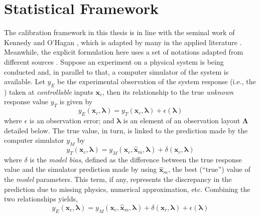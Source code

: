 \section{Statistical Framework}\label{sec:bc_statistical_framework}

The calibration framework in this thesis is in line with the seminal work of Kennedy and O'Hagan \cite{Kennedy2001},
which is adapted by many in the applied literature \cite{Bayarri2007,Higdon2008,Arendt2012,Reichert2012,Higdon2013}.
Meanwhile, the explicit formulation here uses a set of notations adapted from different sources \cite{Kennedy2001,Santner2003,Huard2006,Reichert2012,Wicaksono2016}.
Suppose an experiment on a physical system is being conducted and, in parallel to that, a computer simulator of the system is available.
Let $y_E$ be the experimental observation of the system response (i.e., the ) taken at \emph{controllable} inputs $\bm{x}_c$,
then its relationship to the true \emph{unknown} response value $y_T$ is given by
\begin{equation}
    y_E(\bm{x}_c, \bm{\lambda}) = y_T (\bm{x}_c, \bm{\lambda}) + \epsilon(\bm{\lambda})
\label{eq:bc_observation_true}
\end{equation}
where $\epsilon$ is an observation error;
and $\boldsymbol{\lambda}$ is an element of an observation layout $\boldsymbol{\Lambda}$ detailed below.
The true value, in turn, is linked to the prediction made by the computer simulator $y_M$ by
\begin{equation}
    y_T(\bm{x}_c, \boldsymbol{\lambda}) = y_M (\bm{x}_c, \hat{\bm{x}}_m, \boldsymbol{\lambda}) + \delta (\bm{x}_c, \boldsymbol{\lambda})
\label{eq:bc_true_simulation}
\end{equation}
where $\delta$ is the \emph{model bias}, defined as the difference between the true response value and the simulator prediction made by using $\hat{\bm{x}}_m$, the best (``true'') value of the \emph{model} parameters.
This term, if any, represents the discrepancy in the prediction due to missing physics, numerical approximation, etc. 
Combining the two relationships yields,
\begin{equation}
    y_E(\bm{x}_c, \boldsymbol{\lambda}) = y_M (\bm{x}_c, \hat{\bm{x}}_m, \boldsymbol{\lambda}) + \delta (\bm{x}_c, \boldsymbol{\lambda}) + \epsilon(\bm{\lambda})
\label{eq:bc_observation_simulation_true}
\end{equation}
